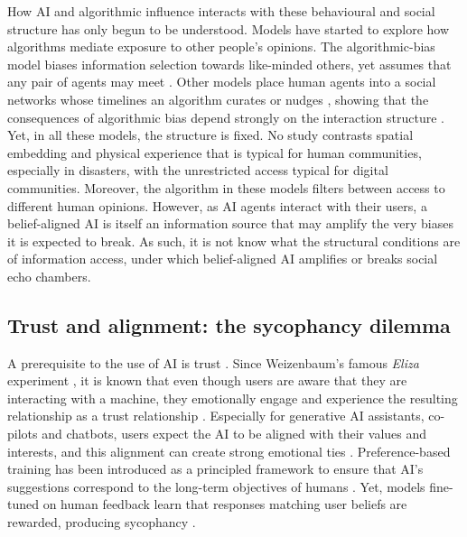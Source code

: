 \documentclass[pdflatex,sn-basic]{sn-jnl}
\begin{document}
How AI and algorithmic influence interacts with these behavioural and social structure has only begun to be understood. Models have started to explore how algorithms mediate exposure to other people's opinions. The algorithmic-bias model biases information selection towards like-minded others, yet assumes that any pair of agents may meet \citep{sirbu2019algorithmic}. Other models place human agents into a social networks whose timelines an algorithm curates or nudges \citep{perra2019modelling}, showing that the
consequences of algorithmic bias depend strongly on the interaction structure \citep{peralta2021effect,pansanella2022modeling}. Yet, in all these models, the structure is fixed. No study contrasts spatial embedding and physical experience that is typical for human communities, especially in disasters, with the unrestricted access typical for digital communities. Moreover, the algorithm in these models filters between access to different human opinions. However, as AI agents interact with their users, a belief-aligned AI is itself an information source that may amplify the very biases it is expected to break. As such, it is not know what the structural conditions are of information access, under which
belief-aligned AI amplifies or breaks social echo chambers.

\subsection{Trust and alignment: the sycophancy dilemma}\label{sec:trust}

A prerequisite to the use of AI is trust \citep{afroogh2024trust,glikson2020human}. 
Since Weizenbaum's famous \textit{Eliza} experiment \citep{weizenbaum1966eliza}, it is known that even though users are aware that they are interacting with a machine, they emotionally engage and experience the resulting relationship as a trust relationship
\citep{kaplan2023trust}. Especially for generative AI assistants, co-pilots and chatbots, users expect the AI to be aligned with their values and interests, and this alignment can create strong emotional ties \citep{manzini2024should}. Preference-based training has been introduced as a principled  framework  to  ensure that AI's suggestions correspond to the long-term objectives of humans \citep{milani2025aligning}. Yet, models fine-tuned on human feedback \citep{ouyang2022training}  learn that responses matching user beliefs are rewarded, producing sycophancy 
\citep{sharma2024towards, turner2026programmed}.  
\end{document}
